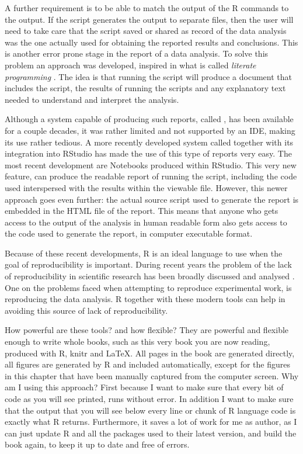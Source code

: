 \documentclass[krantz2,ChapterTOCs]{krantz}\usepackage{knitr}
\begin{document}
A further requirement is to be able to match the output of the R commands to the output. If the script generates the output to separate files, then the user will need to take care that the script saved or shared as record of the data analysis was the one actually used for obtaining the reported results and conclusions. This is another error prone stage in the report of a data analysis. To solve this problem an approach was developed, inspired in what is called \emph{literate programming} \autocite{Knuth1984a}. The idea is that running the script will produce a document that includes the script, the results of running the scripts and any explanatory text needed to understand and interpret the analysis.

Although a system capable of producing such reports, called  \autocite{Leisch2002}, has been available for a couple decades, it was rather limited and not supported by an IDE, making its use rather tedious. A more recently developed system called  \autocite{Xie2013} together with its integration into RStudio has made the use of this type of reports very easy. The most recent development are Notebooks produced within RStudio. This very new feature, can produce the readable report of running the script, including the code used interspersed with the results within the viewable file. However, this newer approach goes even further: the actual source script used to generate the report is embedded in the HTML file of the report. This means that anyone who gets access to the output of the analysis in human readable form also gets access to the code used to generate the report, in computer executable format.

Because of these recent developments, R is an ideal language to use when the goal of reproducibility is important. During recent years the problem of the lack of reproducibility in scientific research has been broadly discussed and analysed \autocite{Gandrud2015}. One on the problems faced when attempting to reproduce experimental work, is reproducing the data analysis. R together with these modern tools can help in avoiding this source of lack of reproducibility.

How powerful are these tools? and how flexible? They are powerful and flexible enough to write whole books, such as this very book you are now reading, produced with R, knitr and \LaTeX. All pages in the book are generated directly, all figures are generated by R and included automatically, except for the figures in this chapter that have been manually captured from the computer screen. Why am I using this approach? First because I want to make sure that every bit of code as you will see printed, runs without error. In addition I want to make sure that the output that you will see below every line or chunk of R language code is exactly what R returns. Furthermore, it saves a lot of work for me as author, as I can just update R and all the packages used to their latest version, and build the book again, to keep it up to date and free of errors.
\end{document}
